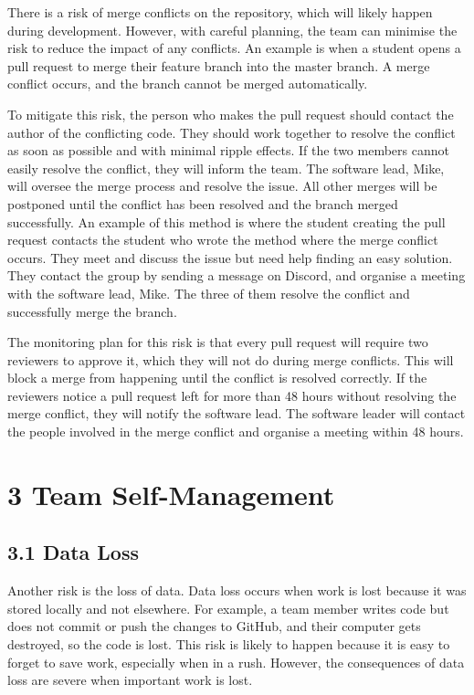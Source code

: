 There is a risk of merge conflicts on the repository, which will likely happen during development. However, with careful planning, the team can minimise the risk to reduce the impact of any conflicts. An example is when a student opens a pull request to merge their feature branch into the master branch. A merge conflict occurs, and the branch cannot be merged automatically.

To mitigate this risk, the person who makes the pull request should contact the author of the conflicting code. They should work together to resolve the conflict as soon as possible and with minimal ripple effects. If the two members cannot easily resolve the conflict, they will inform the team. The software lead, Mike, will oversee the merge process and resolve the issue. All other merges will be postponed until the conflict has been resolved and the branch merged successfully. An example of this method is where the student creating the pull request contacts the student who wrote the method where the merge conflict occurs. They meet and discuss the issue but need help finding an easy solution. They contact the group by sending a message on Discord, and organise a meeting with the software lead, Mike. The three of them resolve the conflict and successfully merge the branch. 

The monitoring plan for this risk is that every pull request will require two reviewers to approve it, which they will not do during merge conflicts. This will block a merge from happening until the conflict is resolved correctly. If the reviewers notice a pull request left for more than 48 hours without resolving the merge conflict, they will notify the software lead. The software leader will contact the people involved in the merge conflict and organise a meeting within 48 hours. 

\section*{3 Team Self-Management}

\subsection*{3.1 Data Loss}

Another risk is the loss of data. Data loss occurs when work is lost because it was stored locally and not elsewhere. For example, a team member writes code but does not commit or push the changes to GitHub, and their computer gets destroyed, so the code is lost. This risk is likely to happen because it is easy to forget to save work, especially when in a rush. However, the consequences of data loss are severe when important work is lost. 

